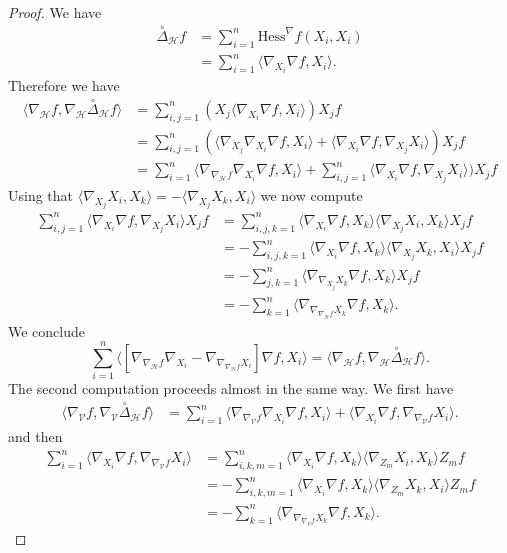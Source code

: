 \documentclass[11pt]{article}
\numberwithin{equation}{section}
\newcommand{\Ho}{\mathcal H}
\newcommand{\V}{\mathcal V}
\begin{document}
	\begin{proof}
		We have
		\begin{align*}
			\overset{\circ}\Delta_{\mathcal{H}} f&=\sum_{i=1}^n \mathrm{Hess}^\nabla f (X_i,X_i) \\
			&=\sum_{i=1}^n \langle \nabla_{X_i} \nabla f, X_i \rangle.
		\end{align*}
		Therefore we have
		\begin{align*}
			\langle \nabla_\Ho f ,\nabla_\Ho \overset{\circ}\Delta_{\mathcal{H}} f \rangle&=\sum_{i,j=1}^n (X_j \langle \nabla_{X_i} \nabla f, X_i \rangle) X_j f \\
			&=\sum_{i,j=1}^n ( \langle \nabla_{X_j} \nabla_{X_i} \nabla f, X_i \rangle+ \langle \nabla_{X_i} \nabla f, \nabla_{X_j} X_i \rangle) X_j f \\
			&=\sum_{i=1}^n \langle \nabla_{\nabla_\Ho f } \nabla_{X_i} \nabla f, X_i \rangle+ \sum_{i,j=1}^n\langle \nabla_{X_i} \nabla f, \nabla_{X_j} X_i \rangle) X_j f %
		\end{align*}
		Using that $\langle \nabla_{X_j} X_i,X_k \rangle=-\langle \nabla_{X_j} X_k,X_i \rangle$ we now compute
		\begin{align*}
			 \sum_{i,j=1}^n  \langle \nabla_{X_i} \nabla f, \nabla_{X_j} X_i \rangle X_j f
			&=\sum_{i,j,k=1}^n  \langle \nabla_{X_i} \nabla f, X_k \rangle \langle \nabla_{X_j} X_i,X_k \rangle X_j f \\
			&=-\sum_{i,j,k=1}^n  \langle \nabla_{X_i} \nabla f, X_k \rangle \langle \nabla_{X_j} X_k,X_i \rangle X_j f \\
			&=-\sum_{j,k=1}^n  \langle \nabla_{\nabla_{X_j} X_k} \nabla f, X_k \rangle  X_j f \\
			&=-\sum_{k=1}^n  \langle \nabla_{\nabla_{\nabla_\Ho f} X_k} \nabla f, X_k \rangle . 
		\end{align*}
		We conclude
		\[
		\sum_{i=1}^n \langle[\nabla_{\nabla_\mathcal{H}f} \nabla_{X_i}-\nabla_{\nabla_{\nabla_\mathcal{H}f} X_i}] \nabla f, X_i \rangle=\langle \nabla_{\mathcal{H}} f , \nabla_{\mathcal{H}}\overset{\circ}\Delta_{\mathcal{H}} f \rangle.
		\]
		The second computation proceeds almost in the same way. We first have
		\begin{align*}
			\langle \nabla_\V f ,\nabla_\V \overset{\circ}\Delta_{\mathcal{H}} f \rangle&=\sum_{i=1}^n \langle \nabla_{\nabla_\V f } \nabla_{X_i} \nabla f, X_i \rangle+ \langle \nabla_{X_i} \nabla f, \nabla_{\nabla_\V f } X_i \rangle.
		\end{align*}
		and then
		\begin{align*}
			\sum_{i=1}^n \langle \nabla_{X_i} \nabla f, \nabla_{\nabla_\V f } X_i \rangle 
			&=\sum_{i,k,m=1}^n  \langle \nabla_{X_i} \nabla f, X_k \rangle \langle \nabla_{Z_m} X_i,X_k \rangle Z_m f \\
			&=-\sum_{i,k,m=1}^n  \langle \nabla_{X_i} \nabla f, X_k \rangle \langle \nabla_{Z_m} X_k,X_i \rangle Z_m f \\
			&=-\sum_{k=1}^n  \langle \nabla_{\nabla_{\nabla_\V f} X_k} \nabla f, X_k \rangle . 
		\end{align*}
		
	\end{proof}
	
\end{document}
